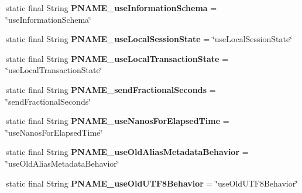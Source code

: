 \begin{DoxyCompactItemize}
static final String {\bfseries P\+N\+A\+M\+E\+\_\+use\+Information\+Schema} = \char`\"{}use\+Information\+Schema\char`\"{}
\item 
\mbox{\label{classcom_1_1mysql_1_1cj_1_1conf_1_1_property_definitions_a4d27174744b75abfcc0f063f5e0efcb5}} 
static final String {\bfseries P\+N\+A\+M\+E\+\_\+use\+Local\+Session\+State} = \char`\"{}use\+Local\+Session\+State\char`\"{}
\item 
\mbox{\label{classcom_1_1mysql_1_1cj_1_1conf_1_1_property_definitions_a9a20aaf659de41f9f8ddb7c563d36b88}} 
static final String {\bfseries P\+N\+A\+M\+E\+\_\+use\+Local\+Transaction\+State} = \char`\"{}use\+Local\+Transaction\+State\char`\"{}
\item 
\mbox{\label{classcom_1_1mysql_1_1cj_1_1conf_1_1_property_definitions_a1ba34fe2bbbe261ccad681394fda2a2d}} 
static final String {\bfseries P\+N\+A\+M\+E\+\_\+send\+Fractional\+Seconds} = \char`\"{}send\+Fractional\+Seconds\char`\"{}
\item 
\mbox{\label{classcom_1_1mysql_1_1cj_1_1conf_1_1_property_definitions_a423fbd8b33eb02f26cd76a3c82b893fe}} 
static final String {\bfseries P\+N\+A\+M\+E\+\_\+use\+Nanos\+For\+Elapsed\+Time} = \char`\"{}use\+Nanos\+For\+Elapsed\+Time\char`\"{}
\item 
\mbox{\label{classcom_1_1mysql_1_1cj_1_1conf_1_1_property_definitions_aaf52418324fad422904ee54c6e70c0bb}} 
static final String {\bfseries P\+N\+A\+M\+E\+\_\+use\+Old\+Alias\+Metadata\+Behavior} = \char`\"{}use\+Old\+Alias\+Metadata\+Behavior\char`\"{}
\item 
\mbox{\label{classcom_1_1mysql_1_1cj_1_1conf_1_1_property_definitions_a58a48459697e56f88bf42a1c492b6413}} 
static final String {\bfseries P\+N\+A\+M\+E\+\_\+use\+Old\+U\+T\+F8\+Behavior} = \char`\"{}use\+Old\+U\+T\+F8\+Behavior\char`\"{}
\item 
\mbox{\label{classcom_1_1mysql_1_1cj_1_1conf_1_1_property_definitions_a9d8fc737592a2dffc8b76ca1eeed50d8}} 

\end{DoxyCompactItemize}
